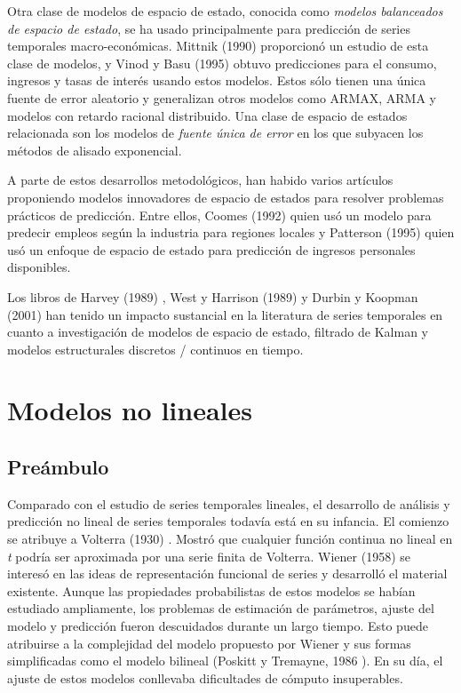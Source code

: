 \documentclass{llncs}
\begin{document}
Otra clase de modelos de espacio de estado, conocida como \emph{modelos balanceados de espacio de estado}, se ha usado principalmente para predicción de series temporales macro-económicas. Mittnik (1990)\cite{Mittnik1990337} proporcionó un estudio de esta clase de modelos, y Vinod y Basu (1995) \cite{Vinod1995217} obtuvo predicciones para el consumo, ingresos y tasas de interés usando estos modelos. Estos sólo tienen una única fuente de error aleatorio y generalizan otros modelos como ARMAX, ARMA y modelos con retardo racional distribuido. Una clase de espacio de estados relacionada son los modelos de \emph{fuente única de error} en los que subyacen los métodos de alisado exponencial.

A parte de estos desarrollos metodológicos, han habido varios artículos proponiendo modelos innovadores de espacio de estados para resolver problemas prácticos de predicción. Entre ellos, Coomes (1992) \cite{Coomes1992473} quien usó un modelo para predecir empleos según la industria para regiones locales y Patterson (1995) \cite{Patterson1995395} quien usó un enfoque de espacio de estado para predicción de ingresos personales disponibles. 

Los libros de Harvey (1989) \cite{Harvey1989}, West y Harrison (1989) \cite{West1997}y Durbin y Koopman (2001) \cite{Durbin2001} han tenido un impacto sustancial en la literatura de series temporales en cuanto a investigación de modelos de espacio de estado, filtrado de Kalman y modelos estructurales discretos / continuos en tiempo. 


\section{Modelos no lineales}

\subsection{Preámbulo}
Comparado con el estudio de series temporales lineales, el desarrollo de análisis y predicción no lineal de series temporales todavía está en su infancia. El comienzo se atribuye a Volterra (1930) \cite{Volterra1959}. Mostró que cualquier función continua no lineal en \emph{t} podría ser aproximada por una serie finita de Volterra. Wiener (1958) \cite{Wiener1958} se interesó en las ideas de representación funcional de series y desarrolló el material existente. Aunque las propiedades probabilistas de estos modelos se habían estudiado ampliamente, los problemas de estimación de parámetros, ajuste del modelo y predicción fueron descuidados durante un largo tiempo. Esto puede atribuirse a la complejidad del modelo propuesto por Wiener y sus formas simplificadas como el modelo bilineal (Poskitt y Tremayne, 1986 \cite{Poskitt1986101}). En su día, el ajuste de estos modelos conllevaba dificultades de cómputo insuperables.
\end{document}
